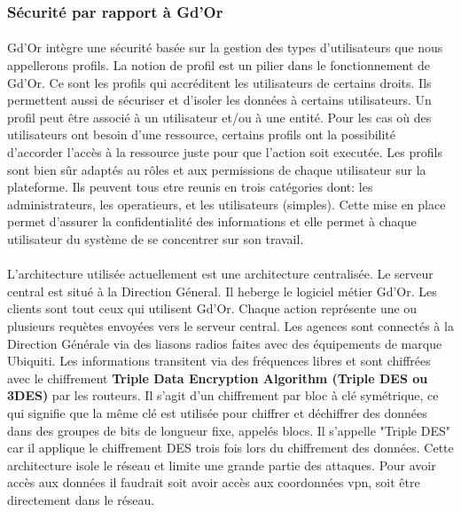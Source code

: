       \subsubsection{S\'ecurit\'e par rapport \`a Gd'Or}
	\paragraph{}
	  Gd'Or int\`egre une s\'ecurit\'e bas\'ee sur la gestion des types d'utilisateurs que nous appellerons profils. La notion de profil est un pilier dans le fonctionnement de Gd'Or. Ce sont les profils qui accréditent les utilisateurs de certains droits. Ils permettent aussi de sécuriser et d'isoler les données à certains utilisateurs. Un profil peut \^etre associé à un utilisateur et/ou \`a une entité. Pour les cas o\`u des utilisateurs ont besoin d'une ressource, certains profils ont la possibilité d'accorder l'acc\`es \`a la ressource juste pour que l'action soit execut\'ee.
	  Les profils sont bien sûr adaptés au r\^oles et aux permissions de chaque utilisateur sur la plateforme. Ils peuvent tous etre reunis en trois cat\'egories dont: les administrateurs, les operatieurs, et les utilisateurs (simples).
	  Cette mise en place permet d'assurer la confidentialité des informations et elle permet à chaque utilisateur du syst\`eme de se concentrer sur son travail.
	  
	\paragraph{}
	  L'architecture utilis\'ee actuellement est une architecture centralis\'ee. Le serveur central est situ\'e \`a la Direction G\'eneral. Il heberge le logiciel m\'etier Gd'Or. Les clients sont tout ceux qui utilisent Gd'Or. Chaque action repr\'esente une ou plusieurs requ\`etes envoy\'ees vers le serveur central. Les agences sont connect\'es \`a 
	  la Direction G\'en\'erale via des liasons radios faites avec des \'equipements de marque Ubiquiti. Les informations transitent via des fr\'equences libres et sont chiffr\'ees avec le chiffrement \textbf{Triple Data Encryption Algorithm (Triple DES ou 3DES)} par les routeurs. Il s'agit d'un chiffrement par bloc à clé symétrique, ce qui signifie que la même clé est utilisée pour chiffrer et déchiffrer des données dans des groupes de bits de longueur fixe, appelés blocs. Il s’appelle "Triple DES" car il applique le chiffrement DES trois fois lors du chiffrement des données. Cette architecture isole le r\'eseau et limite une grande partie des attaques. Pour avoir acc\`es aux donn\'ees il faudrait soit avoir acc\`es aux coordonn\'ees \gls{vpn}, soit \^etre directement dans le r\'eseau. 

